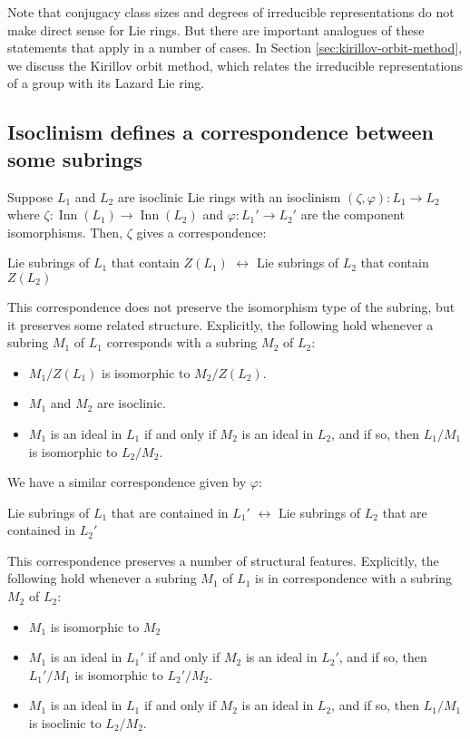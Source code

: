 Note that conjugacy class sizes and degrees of irreducible
representations do not make direct sense for Lie rings. But there are
important analogues of these statements that apply in a number of
cases. In Section \ref{sec:kirillov-orbit-method}, we discuss the
Kirillov orbit method, which relates the irreducible representations
of a group with its Lazard Lie ring.

\subsection{Isoclinism defines a correspondence between some subrings}\label{sec:isoclinism-correspondence-some-subrings}

Suppose $L_1$ and $L_2$ are isoclinic Lie rings with an isoclinism
$(\zeta,\varphi): L_1 \to L_2$ where $\zeta:\operatorname{Inn}(L_1)
\to \operatorname{Inn}(L_2)$ and $\varphi:L_1' \to L_2'$ are the
component isomorphisms. Then, $\zeta$ gives a correspondence:

Lie subrings of $L_1$ that contain $Z(L_1)$ $\leftrightarrow$
Lie subrings of $L_2$ that contain $Z(L_2)$

This correspondence does not preserve the isomorphism type of the
subring, but it preserves some related structure. Explicitly, the
following hold whenever a subring $M_1$ of $L_1$ corresponds with a
subring $M_2$ of $L_2$:

\begin{itemize}
\item $M_1/Z(L_1)$ is isomorphic to $M_2/Z(L_2)$.
\item $M_1$ and $M_2$ are isoclinic.
\item $M_1$ is an ideal in $L_1$ if and only if $M_2$ is an ideal in
  $L_2$, and if so, then $L_1/M_1$ is isomorphic to $L_2/M_2$.
\end{itemize}

We have a similar correspondence given by $\varphi$:

Lie subrings of $L_1$ that are contained in $L_1'$ $\leftrightarrow$
Lie subrings of $L_2$ that are contained in $L_2'$

This correspondence preserves a number of structural
features. Explicitly, the following hold whenever a subring $M_1$ of
$L_1$ is in correspondence with a subring $M_2$ of $L_2$:

\begin{itemize}
\item $M_1$ is isomorphic to $M_2$
\item $M_1$ is an ideal in $L_1'$ if and only if $M_2$ is an ideal in
  $L_2'$, and if so, then $L_1'/M_1$ is isomorphic to $L_2'/M_2$.
\item $M_1$ is an ideal in $L_1$ if and only if $M_2$ is an ideal in
  $L_2$, and if so, then $L_1/M_1$ is isoclinic to $L_2/M_2$.
\end{itemize}

